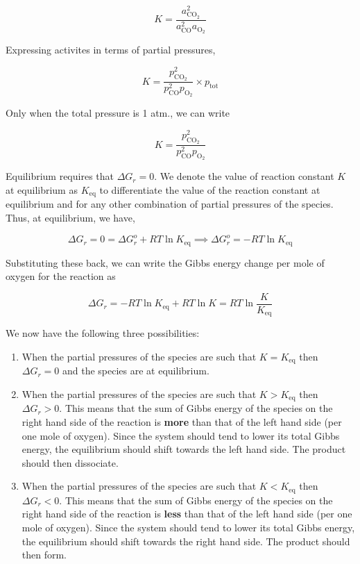 \begin{equation} K = \frac{a^2_{\text{CO}_2}}{a^2_\text{CO}a_{\text{O}_2}} \end{equation}

Expressing activites in terms of partial pressures,

\begin{equation} K = \frac{p^2_{\text{CO}_2}}{p^2_\text{CO}p_{\text{O}_2}} \times p_\text{tot} \end{equation}

Only when the total pressure is 1 atm., we can write

\begin{equation} K = \frac{p^2_{\text{CO}_2}}{p^2_\text{CO}p_{\text{O}_2}} \end{equation}

Equilibrium requires that $\Delta G_r = 0$. We denote the value of reaction constant $K$ at equilibrium as $K_\text{eq}$ to differentiate the value of the reaction constant at equilibrium and for any other combination of partial pressures of the species. Thus, at equilibrium, we have,

\begin{equation} \Delta G_r = 0 = \Delta G^o_r + R T \ln K_\text{eq} \implies \Delta G^o_r = -RT \ln K_\text{eq} \end{equation}

Substituting these back, we can write the Gibbs energy change per mole of oxygen for the reaction as 

\begin{equation} \Delta G_r = - RT \ln K_\text{eq} + RT \ln K = RT \ln \frac{K}{K_\text{eq}} \end{equation}

We now have the following three possibilities:

\begin{enumerate}
\item When the partial pressures of the species are such that $K = K_\text{eq}$ then $\Delta G_r = 0$ and the species are at equilibrium.

\item When the partial pressures of the species are such that $K > K_\text{eq}$ then $\Delta G_r > 0$. This means that the sum of Gibbs energy of the species on the right hand side of the reaction is {\bf more} than that of the left hand side (per one mole of oxygen). Since the system should tend to lower its total Gibbs energy, the equilibrium should shift towards the left hand side. The product should then dissociate.

\item When the partial pressures of the species are such that $K < K_\text{eq}$ then $\Delta G_r < 0$. This means that the sum of Gibbs energy of the species on the right hand side of the reaction is {\bf less} than that of the left hand side (per one mole of oxygen). Since the system should tend to lower its total Gibbs energy, the equilibrium should shift towards the right hand side. The product should then form.
\end{enumerate}
	

